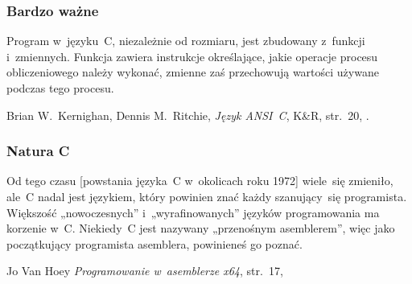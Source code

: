 \documentclass[10pt,t]{beamer}
\begin{document}
\begin{frame}
  \frametitle{Bardzo ważne}


  Program w~języku~C, niezależnie od rozmiaru, jest zbudowany
  z~\alert{funkcji} i~\alert{zmiennych}. Funkcja zawiera \alert{instrukcje}
  określające, jakie operacje procesu obliczeniowego należy wykonać,
  zmienne zaś przechowują wartości używane podczas tego procesu.

  Brian W.~Kernighan, Dennis M.~Ritchie, \textit{Język ANSI~C}, K\&R,
  str.~20, \parencite{Kernighan-Ritchie-Jezyk-ANSI-C-Pub-2004}.

\end{frame}





\begin{frame}
  \frametitle{Natura C}


  Od tego czasu [powstania języka~C w~okolicach roku 1972] wiele~się
  zmieniło, ale~C nadal jest językiem, który powinien znać każdy
  szanujący~się programista. Większość „nowoczesnych” i~„wyrafinowanych”
  języków programowania ma korzenie w~C. Niekiedy~C jest nazywany
  „przenośnym asemblerem”, więc jako początkujący programista asemblera,
  powinieneś go poznać.

  Jo Van Hoey \textit{Programowanie w~asemblerze x64}, str.~17,
  \parencite{}

\end{frame}



















\end{document}
